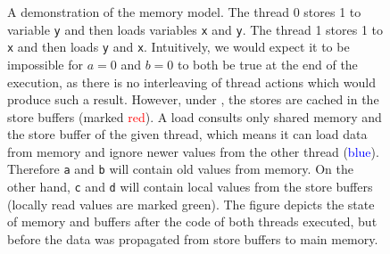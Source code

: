 \begin{figure}[t]
\begin{minipage}[c]{0.77\textwidth}
\begin{center}
  \end{center}
  \end{minipage}

  \caption{
  A demonstration of the \xtso memory model.
  The thread 0 stores 1 to variable \texttt{y} and then loads variables \texttt{x} and \texttt{y}.
  The thread 1 stores 1 to \texttt{x} and then loads \texttt{y} and \texttt{x}.
  Intuitively, we would expect it to be impossible for $a = 0$ and $b = 0$ to both be true at the end of the execution, as there is no interleaving of thread actions which would produce such a result.
  However, under \xtso, the stores are cached in the store buffers (marked \textcolor{red}{red}).
  A load consults only shared memory and the store buffer of the given thread, which means it can load data from memory and ignore newer values from the other thread (\textcolor{blue}{blue}).
  Therefore \texttt{a} and \texttt{b} will contain old values from memory.
  On the other hand, \texttt{c} and \texttt{d} will contain local values from the store buffers (locally read values are marked \textcolor{frombuf}{green}).
  The figure depicts the state of memory and buffers after the code of both
  threads executed, but before the data was propagated from store buffers to
  main memory.
  }

  \label{fig:xtso}
\end{figure}

